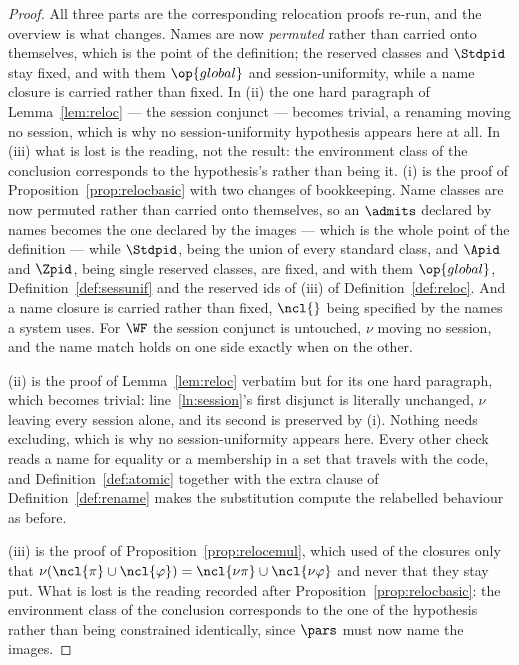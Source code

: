 \documentclass[10pt,oneside,openany]{book}
\theoremstyle{accentdef}
\theoremstyle{accentplain}
\begin{document}
\begin{proof}
All three parts are the corresponding relocation proofs re-run, and the overview is what changes.
Names are now \emph{permuted} rather than carried onto themselves, which is the point of the
definition; the reserved classes and $\Stdpid$ stay fixed, and with them $\op{global}$ and
session-uniformity, while a name closure is carried rather than fixed. In (ii) the one hard paragraph
of Lemma~\ref{lem:reloc} --- the session conjunct --- becomes trivial, a renaming moving no session,
which is why no session-uniformity hypothesis appears here at all. In (iii) what is lost is the
reading, not the result: the environment class of the conclusion corresponds to the hypothesis's
rather than being it.
(i) is the proof of Proposition~\ref{prop:relocbasic} with two changes of bookkeeping. Name classes are
now permuted rather than carried onto themselves, so an $\admits$ declared by names becomes the one
declared by the images --- which is the whole point of the definition --- while $\Stdpid$, being the union
of every standard class, and $\Apid$ and $\Zpid$, being single reserved classes, are fixed, and with
them $\op{global}$, Definition~\ref{def:sessunif} and the reserved ids of (iii) of
Definition~\ref{def:reloc}. And a name closure is carried rather than fixed, $\ncl{}$ being specified by
the names a system uses. For $\WF$ the session conjunct is untouched, $\nu$ moving no session, and the
name match holds on one side exactly when on the other.

(ii) is the proof of Lemma~\ref{lem:reloc} verbatim but for its one hard paragraph, which becomes
trivial: line~\ref{ln:session}'s first disjunct is literally unchanged, $\nu$ leaving every session
alone, and its second is preserved by (i). Nothing needs excluding, which is why no session-uniformity
appears here. Every other check reads a name for equality or a membership in a set that travels with
the code, and Definition~\ref{def:atomic} together with the extra clause of
Definition~\ref{def:rename} makes the substitution compute the relabelled behaviour as before.

(iii) is the proof of Proposition~\ref{prop:relocemul}, which used of the closures only that
$\nu(\ncl{\pi} \cup \ncl{\varphi}) = \ncl{\nu\pi} \cup \ncl{\nu\varphi}$ and never that they stay put.
What is lost is the reading recorded after Proposition~\ref{prop:relocbasic}: the environment class of
the conclusion corresponds to the one of the hypothesis rather than being constrained identically,
since $\pars$ must now name the images.
\end{proof}
\end{document}
